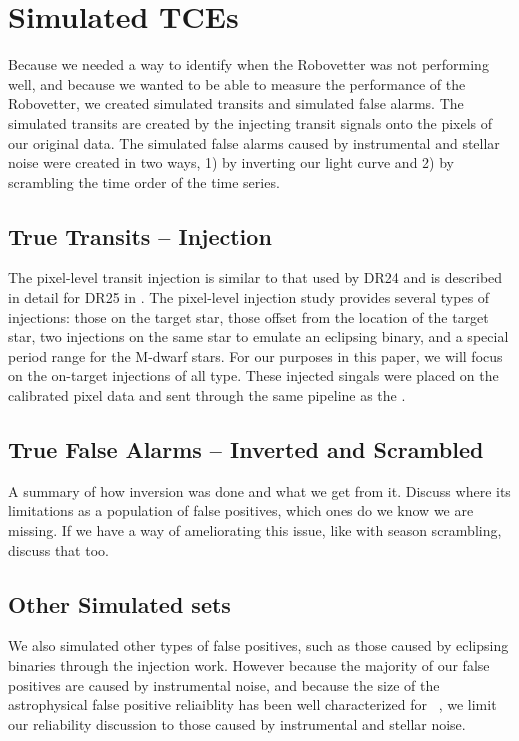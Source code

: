\section{Simulated TCEs}

Because we needed a way to identify when the Robovetter was not performing well, and because we wanted to be able to measure the performance of the Robovetter, we created simulated transits and simulated false alarms. The simulated transits are created by the injecting transit signals onto the pixels of our original data.  The simulated false alarms caused by instrumental and stellar noise were created in two ways, 1) by inverting our light curve and 2) by scrambling the time order of the time series.  


\subsection{True Transits -- Injection}
\label{injectsec}
The pixel-level transit injection is similar to that used by DR24 \citep{Christiansen2016} and is described in detail for DR25 in \citep{Christiansen2017}. The pixel-level injection study provides several types of injections: those on the target star, those offset from the location of the target star, two injections on the same star to emulate an eclipsing binary, and a special period range for the M-dwarf stars.  For our purposes in this paper, we will focus on the on-target injections of all type.  These injected singals were placed on the calibrated pixel data and sent through the same \Kepler{} pipeline as the \obstces.


\subsection{True False Alarms -- Inverted and Scrambled} 



A summary of how inversion was done and what we get from it. Discuss where its limitations as a population of false positives, which ones do we know we are missing. If we have a way of ameliorating this issue, like with season scrambling, discuss that too.


\subsection{Other Simulated sets}
We also simulated other types of false positives, such as those caused by eclipsing binaries through the injection work. However because the majority of our false positives are caused by instrumental noise, and because the size of the astrophysical false positive reliaiblity has been well characterized for \Kepler\ \citep[e.g.][]{Morton2016}, we limit our reliability discussion to those caused by instrumental and stellar noise.